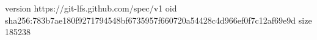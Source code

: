version https://git-lfs.github.com/spec/v1
oid sha256:783b7ae180f9271794548bf6735957f660720a54428c4d966ef0f7c12af69e9d
size 185238
